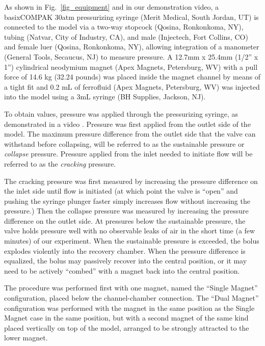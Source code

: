 \documentclass{asme2ej}
\begin{document}
As shown in Fig.~\ref{fig_equipment} and in our demonstration video\cite{stuckey2021video},
a basixCOMPAK 30atm pressurizing syringe (Merit Medical, South Jordan,
UT) is connected to the model via a two-way stopcock (Qosina,
Ronkonkoma, NY), tubing (Natvar, City of Industry, CA), and male
(Injectech, Fort Collins, CO) and female luer (Qosina, Ronkonkoma,
NY), allowing integration of a manometer (General Tools, Secaucus, NJ)
to measure pressure. A 12.7mm x 25.4mm (1/2” x 1”)
cylindrical neodymium magnet (Apex
Magnets, Petersburg, WV) with a pull force of 14.6 kg (32.24 pounds)
was placed inside the magnet channel by means
of a tight fit and 0.2 mL of ferrofluid (Apex Magnets, Petersburg, WV)
was injected into the model using a 3mL syringe (BH Supplies, Jackson,
NJ).

To obtain values, pressure was applied through the pressurizing
syringe, as demonstrated in a video \cite{stuckey2021video}.
Pressure was first applied from the outlet side of the model.
The maximum pressure difference from the outlet side that the
valve can withstand before collapsing, will be referred to as the
sustainable pressure or {\em collapse} pressure.
Pressure applied from the inlet needed to
initiate flow will be referred to as the {\em cracking} pressure.

The cracking pressure was first measured by increasing the pressure
difference on the inlet side until flow is initiated (at which point
the valve is ``open'' and
pushing the syringe plunger faster simply increases flow without
increasing the pressure.) Then the
collapse pressure was measured by increasing the pressure
difference on the outlet side. At pressures below the sustainable
pressure, the valve holds pressure well with no observable leaks of
air in the short time (a few minutes) of our experiment. When the
sustainable pressure is exceeded, the bolus explodes violently into
the recovery chamber. When the pressure difference is equalized, the
bolus may passively recover into the central position, or it may need
to be actively “combed” with a magnet back into the central position.

The procedure was performed first with one magnet, named the “Single
Magnet” configuration, placed below the channel-chamber connection.
The “Dual Magnet” configuration was performed with the magnet in the
same position as the Single Magnet case in the same position, but with
a second magnet of the same kind placed vertically on top of the model,
arranged to be strongly attracted to the lower magnet.
\end{document}
